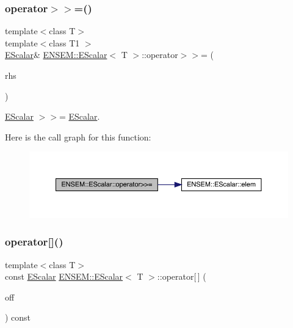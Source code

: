 \subsubsection{\texorpdfstring{operator$>$$>$=()}{operator>>=()}\hspace{0.1cm}{\footnotesize\ttfamily [2/2]}}
{\footnotesize\ttfamily template$<$class T$>$ \\
template$<$class T1 $>$ \\
\mbox{\hyperlink{classENSEM_1_1EScalar}{E\+Scalar}}\& \mbox{\hyperlink{classENSEM_1_1EScalar}{E\+N\+S\+E\+M\+::\+E\+Scalar}}$<$ T $>$\+::operator$>$$>$= (\begin{DoxyParamCaption}\item[{const \mbox{\hyperlink{classENSEM_1_1EScalar}{E\+Scalar}}$<$ T1 $>$ \&}]{rhs }\end{DoxyParamCaption})\hspace{0.3cm}{\ttfamily [inline]}}



\mbox{\hyperlink{classENSEM_1_1EScalar}{E\+Scalar}} $>$$>$= \mbox{\hyperlink{classENSEM_1_1EScalar}{E\+Scalar}}. 

Here is the call graph for this function\+:
\nopagebreak
\begin{figure}[H]
\begin{center}
\leavevmode
\includegraphics[width=350pt]{d0/d82/classENSEM_1_1EScalar_a0e520529327800038c3775d195819b6f_cgraph}
\end{center}
\end{figure}
\mbox{\label{classENSEM_1_1EScalar_a20c80375941641aca36355253b3479ac}} 
\subsubsection{\texorpdfstring{operator[]()}{operator[]()}\hspace{0.1cm}{\footnotesize\ttfamily [1/2]}}
{\footnotesize\ttfamily template$<$class T$>$ \\
const \mbox{\hyperlink{classENSEM_1_1EScalar}{E\+Scalar}} \mbox{\hyperlink{classENSEM_1_1EScalar}{E\+N\+S\+E\+M\+::\+E\+Scalar}}$<$ T $>$\+::operator\mbox{[}$\,$\mbox{]} (\begin{DoxyParamCaption}\item[{int}]{off }\end{DoxyParamCaption}) const\hspace{0.3cm}{\ttfamily [inline]}}



